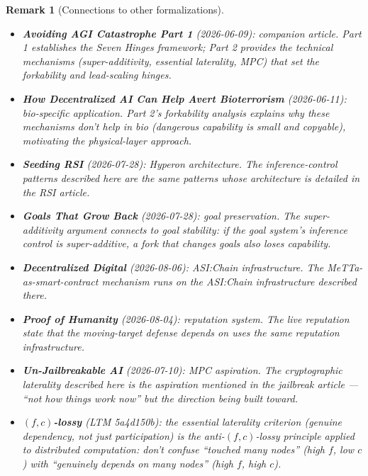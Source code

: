 \documentclass[11pt,a4paper]{article}
\newtheorem{remark}[definition]{Remark}
\begin{document}
\begin{remark}[Connections to other formalizations]
\begin{itemize}
\item \textbf{Avoiding AGI Catastrophe Part 1} (2026-06-09):
  companion article. Part 1 establishes the Seven Hinges framework;
  Part 2 provides the technical mechanisms (super-additivity,
  essential laterality, MPC) that set the forkability and
  lead-scaling hinges.
\item \textbf{How Decentralized AI Can Help Avert Bioterrorism}
  (2026-06-11): bio-specific application. Part 2's forkability
  analysis explains why these mechanisms don't help in bio
  (dangerous capability is small and copyable), motivating the
  physical-layer approach.
\item \textbf{Seeding RSI} (2026-07-28): Hyperon architecture.
  The inference-control patterns described here are the same
  patterns whose architecture is detailed in the RSI article.
\item \textbf{Goals That Grow Back} (2026-07-28): goal preservation.
  The super-additivity argument connects to goal stability: if
  the goal system's inference control is super-additive, a fork
  that changes goals also loses capability.
\item \textbf{Decentralized Digital} (2026-08-06): ASI:Chain
  infrastructure. The MeTTa-as-smart-contract mechanism runs on
  the ASI:Chain infrastructure described there.
\item \textbf{Proof of Humanity} (2026-08-04): reputation system.
  The live reputation state that the moving-target defense depends
  on uses the same reputation infrastructure.
\item \textbf{Un-Jailbreakable AI} (2026-07-10): MPC aspiration.
  The cryptographic laterality described here is the aspiration
  mentioned in the jailbreak article --- ``not how things work now''
  but the direction being built toward.
\item \textbf{$(f,c)$-lossy} (LTM 5a4d150b): the essential laterality
  criterion (genuine dependency, not just participation) is the
  anti-$(f,c)$-lossy principle applied to distributed computation:
  don't confuse ``touched many nodes'' (high $f$, low $c$) with
  ``genuinely depends on many nodes'' (high $f$, high $c$).
\end{itemize}
\end{remark}
\end{document}
